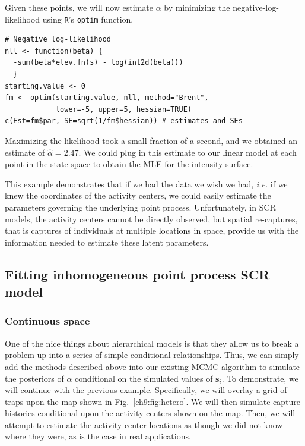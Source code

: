 Given these points, we will now estimate $\alpha$ by minimizing the
negative-log-likelihood using \verb+R+'s \verb+optim+ function.

\begin{small}
\begin{verbatim}
# Negative log-likelihood
nll <- function(beta) {
  -sum(beta*elev.fn(s) - log(int2d(beta)))
  }
starting.value <- 0
fm <- optim(starting.value, nll, method="Brent",
            lower=-5, upper=5, hessian=TRUE)
c(Est=fm$par, SE=sqrt(1/fm$hessian)) # estimates and SEs
\end{verbatim}
\end{small}


Maximizing the likelihood took a small fraction of a second, and we
obtained an estimate of $\hat{\alpha}=2.47$. We could plug in
this estimate to our linear model at each point in the state-space to
obtain the MLE for the intensity surface.

This example demonstrates
that if we had the data we wish we had, {\it i.e.} if we knew the
coordinates of the activity centers, we could easily estimate the
parameters governing the underlying point process. Unfortunately, in
SCR models, the activity centers cannot be directly observed, but
spatial re-captures, that is captures of individuals at
multiple locations in space, provide us with the information needed to
estimate these latent parameters.

\subsection{Fitting inhomogeneous point process SCR model}

\subsubsection{Continuous space}

One of the nice things about hierarchical models is that they allow us
to break a problem up into a series of simple conditional
relationships. Thus,
we can simply add the methods described above into our existing MCMC
algorithm to simulate the posteriors of $\alpha$ conditional on the
simulated values of $\mathbf{s}_i$. To demonstrate, we will continue with
the previous example. Specifically, we will overlay a grid of
traps upon the map shown in Fig.~\ref{ch9:fig:hetero}. We will then
simulate capture histories conditional upon the activity centers shown
on the map. Then, we will attempt to estimate the activity center
locations as though we did not know where they were, as is the case in
real applications.

